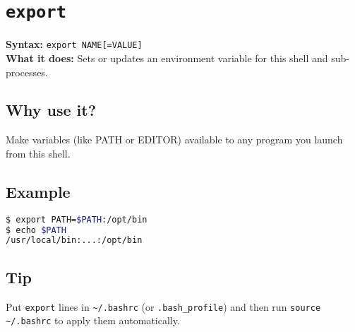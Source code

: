 \documentclass[10pt,oneside]{scrbook}
\begin{document}
\section{\texttt{export}}
\begin{cmdbox}
  \textbf{Syntax:} \lstinline!export NAME[=VALUE]! \\
  \textbf{What it does:} Sets or updates an environment variable for this shell and sub-processes.
\end{cmdbox}
\begin{commanddetails}
  \subsection*{Why use it?}
    Make variables (like PATH or EDITOR) available to any program you launch from this shell.

  \subsection*{Example}
  \begin{lstlisting}[language=bash]
$ export PATH=$PATH:/opt/bin
$ echo $PATH
/usr/local/bin:...:/opt/bin
  \end{lstlisting}

  \subsection*{Tip}
    Put \lstinline!export! lines in \lstinline!~/.bashrc! (or \lstinline!.bash_profile!) and then run \lstinline!source ~/.bashrc! to apply them automatically.
\end{commanddetails}

\end{document}
